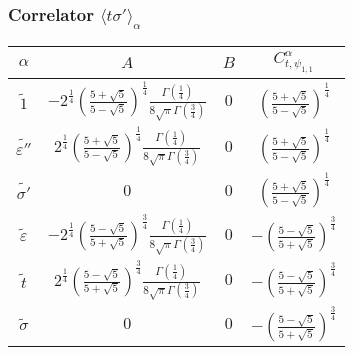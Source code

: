 \documentclass[a4paper,12pt]{report}
\begin{document}
\subsubsection{Correlator $\langle t \sigma'\rangle_{\alpha}$}
\begin{center}
\begin{tabular}{|c|c|c|c|}\hline
$\alpha$ &  $A$  & $B$ & $ C_{t,\psi_{1,1}}^{\alpha}$  \\
\hline

$\tilde{1}$ & $-2^{\frac{1}{4}}\left(\frac{5+\sqrt{5}}{5-\sqrt{5}} \right)^{\frac{1}{4}}\frac{\Gamma \left(\frac{1}{4} \right)}{8\sqrt{\pi }\Gamma \left(\frac{3}{4} \right)}$ & $0$ & $\left(\frac{5+\sqrt{5}}{5-\sqrt{5}} \right)^{\frac{1}{4}}$ \\

$\tilde{\varepsilon''}$ & $2^{\frac{1}{4}}\left(\frac{5+\sqrt{5}}{5-\sqrt{5}} \right)^{\frac{1}{4}}\frac{\Gamma \left(\frac{1}{4} \right)}{8\sqrt{\pi }\Gamma \left(\frac{3}{4} \right)}$ & $0$ & $\left(\frac{5+\sqrt{5}}{5-\sqrt{5}} \right)^{\frac{1}{4}}$ \\

$\tilde{\sigma'}$ & $0$ & $0$ & $\left(\frac{5+\sqrt{5}}{5-\sqrt{5}}
\right)^{\frac{1}{4}}$ \\

$\tilde{\varepsilon}$ & $-2^{\frac{1}{4}}\left(\frac{5-\sqrt{5}}{5+\sqrt{5}} \right)^{\frac{3}{4}}\frac{\Gamma
\left(\frac{1}{4} \right)}{8\sqrt{\pi }\Gamma \left(\frac{3}{4} \right)}$ & $0$ & $-\left(\frac{5-\sqrt{5}}{5+\sqrt{5}} \right)^{\frac{3}{4}}$ \\

$\tilde{t}$ & $2^{\frac{1}{4}}\left(\frac{5-\sqrt{5}}{5+\sqrt{5}} \right)^{\frac{3}{4}}\frac{\Gamma
\left(\frac{1}{4} \right)}{8\sqrt{\pi }\Gamma \left(\frac{3}{4} \right)}$ & $0$ & $-\left(\frac{5-\sqrt{5}}{5+\sqrt{5}} \right)^{\frac{3}{4}}$ \\

$\tilde{\sigma}$ & $0$ & $0$ & $-\left(\frac{5-\sqrt{5}}{5+\sqrt{5}} \right)^{\frac{3}{4}}$ \\
\hline
\end{tabular}
\end{center}
\end{document}

